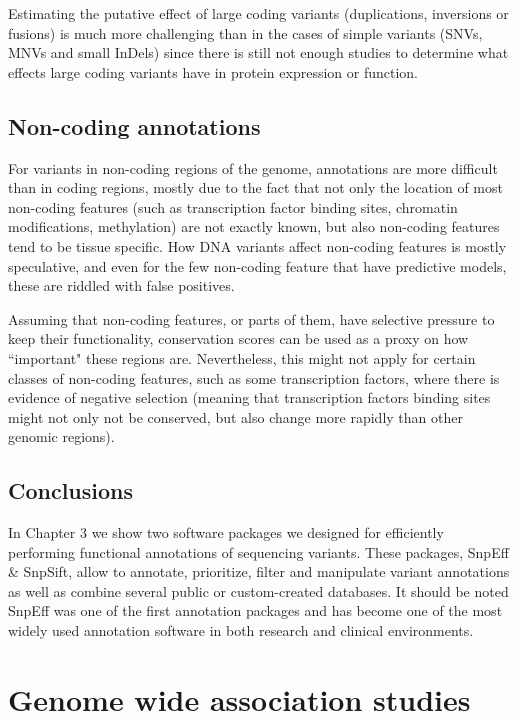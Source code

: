 Estimating the putative effect of large coding variants (duplications, inversions or fusions) is much more challenging than in the cases of simple variants (SNVs, MNVs and small InDels) since there is still not enough studies to determine what effects large coding variants have in protein expression or function.

\subsection{Non-coding annotations}

For variants in non-coding regions of the genome, annotations are more difficult than in coding regions, mostly due to the fact that not only the location of most non-coding features (such as transcription factor binding sites, chromatin modifications, methylation) are not exactly known, but also non-coding features tend to be tissue specific. How DNA variants affect non-coding features is mostly speculative, and even for the few non-coding feature that have predictive models, these are riddled with false positives.

Assuming that non-coding features, or parts of them, have selective pressure to keep their functionality, conservation scores can be used as a proxy on how ``important" these regions are. Nevertheless, this might not apply for certain classes of non-coding features, such as some transcription factors, where there is evidence of negative selection (meaning that transcription factors binding sites might not only not be conserved, but also change more rapidly than other genomic regions).

\subsection{Conclusions}

In Chapter 3 we show two software packages we designed for efficiently performing functional annotations of sequencing variants. These packages, SnpEff \& SnpSift, allow to annotate, prioritize, filter and manipulate variant annotations as well as combine several public or custom-created databases. It should be noted SnpEff was one of the first annotation packages and has become one of the most widely used annotation software in both research and clinical environments. 

\section{Genome wide association studies}

